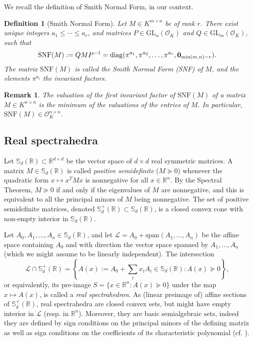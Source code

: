 \documentclass[a4paper,oneside,11pt]{article}
\newtheorem{definition}[theorem]{Definition}
\newtheorem{remark}[theorem]{Remark}
\newcommand{\R}{\mathbb{R}} %
\newcommand{\sym}{\mathbb{S}} %
\renewcommand{\span}[1]{{\text{span}(#1)}} %
\newcommand{\calL}{\mathcal{L}} %
\newcommand{\OK}{\mathcal{O}_K}
\def\diag{\mathrm{diag}}
\newcommand{\GL}{\mathrm{GL}}
\begin{document}
We recall the definition of Smith Normal Form, in our context.
\begin{definition}[Smith Normal Form]\label{smith_nf}
  Let $M \in K^{m \times n}$ be of rank $r$. There exist unique integers $a_1 \leq \cdots \leq a_r$, and
  matrices $P \in \GL_n(\OK)$ and $Q \in \GL_m(\OK)$, such that
  $$
  \mathrm{SNF}(M) := QMP^{-1} = \diag(\pi^{a_1}, \pi^{a_2}, \ldots, \pi^{a_r}, {\bf 0}_{\min(m,n)-r}).
  $$
  The matrix $\mathrm{SNF}(M)$ is called the \emph{Smith Normal Form (SNF)} of $M$, and the elements $\pi^{a_i}$ the
  \emph{invariant factors}.
\end{definition}
\begin{remark}
  The valuation of the first invariant factor of $\mathrm{SNF}(M)$ of a matrix
  $M \in K^{n \times n}$ is the minimum of the valuations of the entries of
  $M$. In particular, $\mathrm{SNF}(M) \in \OK^{n \times n}$.
\end{remark}


\subsection{Real spectrahedra}

Let $\sym_d(\R) \subset \R^{d\times d}$ be the vector space of $d \times d$ real symmetric
matrices. A matrix $M \in \sym_d(\R)$
is called \emph{positive semidefinite} ($M \succeq 0$) whenever the quadratic
form $x \mapsto x^TMx$ is nonnegative for all $x\in \R^n$. By the Spectral Theorem, $M \succeq 0$
if and only if the eigenvalues of $M$ are nonnegative, and this is equivalent to all the principal minors
of $M$ being nonnegative. The set of positive semidefinite matrices, denoted $\sym_d^+(\R) \subset \sym_d(\R)$,
is a closed convex cone with non-empty interior in $\sym_d(\R)$.

Let $A_0,A_1,\ldots,A_n \in \sym_d(\R)$, and let $\calL = A_0+\span{A_1,\ldots,A_n}$ be the affine space
containing $A_0$ and with direction the vector space spanned by $A_1,\ldots,A_n$ (which we might assume
to be linearly independent). The intersection
$$
\calL \cap \sym_d^+(\R) = \left\{A(x) := A_0+\sum_i x_i A_i \in \sym_d(\R) :
A(x) \succeq 0\right\},
$$
or equivalently, its pre-image $S = \{x \in \R^n : A(x) \succeq 0\}$ under the map $x \mapsto A(x)$, is called
a \emph{real spectrahedron}. As (linear preimage of) affine sections of $\sym_d^+(\R)$, real spectrahedra
are closed convex sets, but might have empty interior in $\calL$ (resp. in $\R^n$).
Moreover, they are basic semialgebraic sets, indeed they are defined by sign conditions on the principal
minors of the defining matrix as well as sign conditions on the coefficients of its characteristic polynomial
(cf. ).
\end{document}
